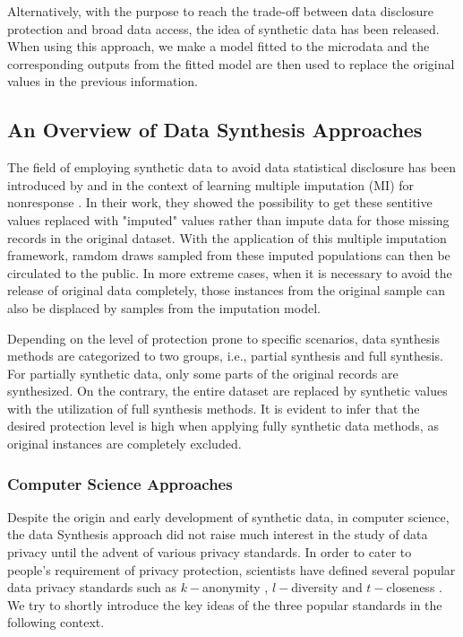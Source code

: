 Alternatively, with the purpose to reach the trade-off between data disclosure protection and broad
data access, the idea of synthetic data has been released. When using this approach, we make a model
fitted to the microdata and the corresponding outputs from the fitted model are then used to replace
the original values in the previous information.


\subsection{An Overview of Data Synthesis Approaches}
\label{subsec:datasynthesis}
The field of employing synthetic data to avoid data statistical disclosure has been introduced by \citet{rubin1993statistical}
and \citet{little1993statistical} in the context of learning multiple imputation (MI) for nonresponse \citep{little2019statistical}.
In their work, they showed the possibility to get these sentitive values replaced with "imputed" values
rather than impute data for those missing records in the original dataset. With the application of this multiple
imputation framework, ramdom draws sampled from these imputed populations can then be circulated to the public. In more
extreme cases, when it is necessary to avoid the release of original data completely, those instances from
the original sample can also be displaced by samples from the imputation model.

Depending on the level of protection prone to specific scenarios, data synthesis methods are categorized to two groups, i.e.,
partial synthesis and full synthesis. For partially synthetic data, only some parts of the original records are synthesized. 
On the contrary, the entire dataset are replaced by synthetic values with the utilization of full synthesis methods.
It is evident to infer that the desired protection level is high when applying fully synthetic data methods, as original instances
are completely excluded. 



\subsubsection{Computer Science Approaches}
\label{subsubsec:csapproach}
Despite the origin and early development of synthetic data, in computer science, the data Synthesis
approach did not raise much interest in the study of data privacy until the advent of various privacy
standards. In order to cater to people's requirement of privacy protection, scientists have defined
several popular data privacy standards such as $k-$anonymity \citep{sweeney2002k}, $l-$diversity \citep{machanavajjhala2007diversity}
and $t-$closeness \citep{li2006t}. We try to shortly introduce the key ideas of the three popular
standards in the following context. 

